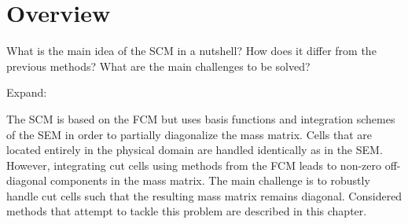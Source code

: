 %
\section{Overview}
\label{section:overview}
%

What is the main idea of the SCM in a nutshell?
How does it differ from the previous methods?
What are the main challenges to be solved?

Expand:

The SCM is based on the FCM but uses basis functions and integration schemes
of the SEM in order to partially diagonalize the mass matrix. Cells that are
located entirely in the physical domain are handled identically as in the SEM.
However, integrating cut cells using methods from the FCM leads to non-zero
off-diagonal components in the mass matrix. The main challenge is to
robustly handle cut cells such that the resulting mass matrix remains diagonal.
Considered methods that attempt to tackle this problem are described in this
chapter.